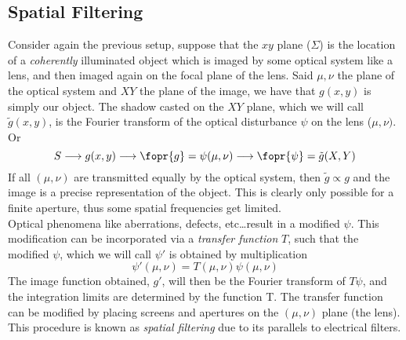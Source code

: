 \documentclass[../electromagnetism.tex]{subfiles}
\begin{document}
\subsection{Spatial Filtering}
Consider again the previous setup, suppose that the $xy$ plane ($\Sigma$) is the location of a \textit{coherently} illuminated object which is imaged by some optical system like a lens, and then imaged again on the focal plane of the lens. Said $\mu, \nu$ the plane of the optical system and $XY$ the plane of the image, we have that $g(x, y)$ is simply our object. The shadow casted on the $XY$ plane, which we will call $\tilde{g}(x, y)$, is the Fourier transform of the optical disturbance $\psi$ on the lens ($\mu, \nu)$. Or
\begin{equation}
	S\longrightarrow g(x, y)\longrightarrow \fopr{g}=\psi(\mu, \nu)\longrightarrow\fopr{\psi}=\tilde{g}(X, Y)
	\label{eq:what.fdiff}
\end{equation}
If all $(\mu, \nu)$ are transmitted equally by the optical system, then $\tilde{g}\propto g$ and the image is a precise representation of the object. This is clearly only possible for a finite aperture, thus some spatial frequencies get limited.\\
Optical phenomena like aberrations, defects, etc\ldots result in a modified $\psi$. This modification can be incorporated via a \textit{transfer function} $T$, such that the modified $\psi$, which we will call $\psi'$ is obtained by multiplication
\begin{equation}
	\psi'(\mu, \nu)=T(\mu, \nu)\psi(\mu, \nu)
	\label{eq:transfer.fdiff}
\end{equation}
The image function obtained, $g'$, will then be the Fourier transform of $T\psi$, and the integration limits are determined by the function T. The transfer function can be modified by placing screens and apertures on the $(\mu, \nu)$ plane (the lens). This procedure is known as \textit{spatial filtering} due to its parallels to electrical filters.\\
\end{document}
